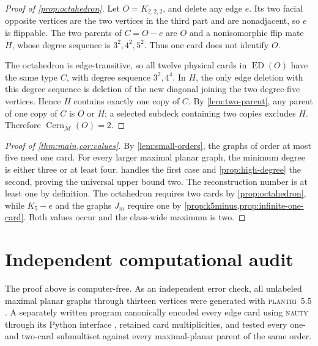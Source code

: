 \documentclass[11pt]{article}
\theoremstyle{definition}
\theoremstyle{remark}
\newcommand{\M}{\mathcal M}
\newcommand{\ED}{\operatorname{ED}}
\newcommand{\Cern}{\operatorname{Cern}}
\begin{document}
\begin{proof}[Proof of \cref{prop:octahedron}]
Let \(O=K_{2,2,2}\), and delete any edge \(e\).  Its two facial opposite
vertices are the two vertices in the third part and are nonadjacent, so
\(e\) is flippable.  The two parents of \(C=O-e\) are \(O\) and a
nonisomorphic flip mate \(H\), whose degree sequence is
\(3^2,4^2,5^2\).  Thus one card does not identify \(O\).

The octahedron is edge-transitive, so all twelve physical cards in
\(\ED(O)\) have the same type \(C\), with degree sequence \(3^2,4^4\).  In
\(H\), the only edge deletion with this degree sequence is deletion of the
new diagonal joining the two degree-five vertices.  Hence \(H\) contains
exactly one copy of \(C\).  By \cref{lem:two-parent}, any parent of one copy
of \(C\) is \(O\) or \(H\); a selected subdeck containing two copies excludes
\(H\).  Therefore \(\Cern_{\M}(O)=2\).
\end{proof}

\begin{proof}[Proof of \cref{thm:main,cor:values}]
By \cref{lem:small-orders}, the graphs of order at most five need one card.
For every larger maximal planar graph, the minimum degree is either three or
at least four.   handles the first case and
\cref{prop:high-degree} the second, proving the universal upper bound two.
The reconstruction number is at least one by definition.  The octahedron
requires two cards by \cref{prop:octahedron}, while \(K_5-e\) and the graphs
\(J_m\) require one by \cref{prop:k5minus,prop:infinite-one-card}.  Both
values occur and the class-wide maximum is two.
\end{proof}

\section{Independent computational audit}\label{app:computation}

The proof above is computer-free.  As an independent error check, all
unlabeled maximal planar graphs through thirteen vertices were generated with
\textsc{plantri}~5.5 \cite{BrinkmannMcKay2007}.  A separately written program
canonically encoded every edge card using \textsc{nauty} through its Python
interface \cite{McKayPiperno2014}, retained card multiplicities, and tested
every one- and two-card submultiset against every maximal-planar parent of the
same order.
\end{document}

